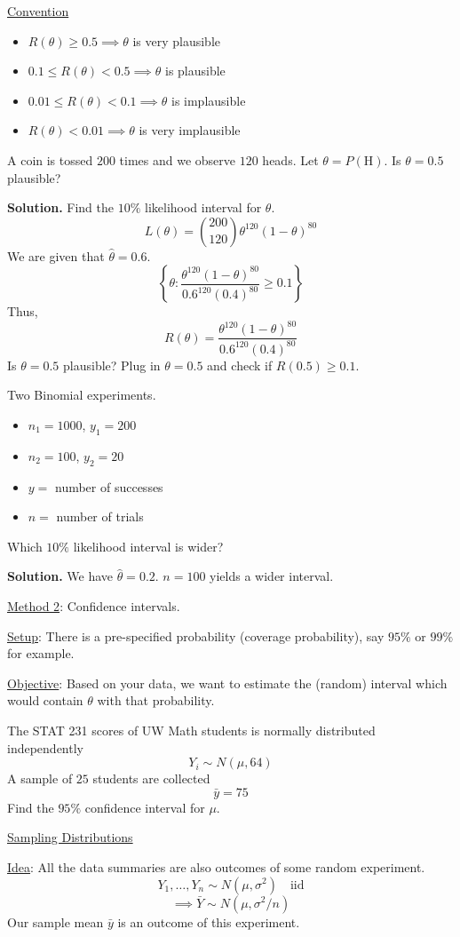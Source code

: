 \underline{Convention}
\begin{itemize}
    \item $ R(\theta)\geqslant 0.5\implies \theta $ is very plausible
    \item $ 0.1\leqslant R(\theta)<0.5\implies \theta $ is plausible
    \item $ 0.01\leqslant R(\theta)<0.1\implies \theta $ is implausible
    \item $ R(\theta)<0.01\implies \theta $ is very implausible
\end{itemize}

\begin{Example}{}{}
    A coin is tossed $ 200 $ times and we observe $ 120 $ heads.
    Let $ \theta=P(\text{H}) $. Is $ \theta=0.5 $ plausible?

    \textbf{Solution.} Find the $ 10\% $ likelihood interval for $ \theta $.
    \[ L(\theta)=\binom{200}{120}\theta^{120}(1-\theta)^{80} \]
    We are given that $ \hat{\theta}=0.6 $.
    \[ \left\{ \theta:\frac{\theta^{120}(1-\theta)^{80}}{0.6^{120}(0.4)^{80}}\geqslant 0.1 \right\} \]
    Thus,
    \[ R(\theta)=\frac{\theta^{120}(1-\theta)^{80}}{0.6^{120}(0.4)^{80}} \]
    Is $ \theta=0.5 $ plausible? Plug in $ \theta=0.5 $ and check if $ R(0.5)\geqslant 0.1 $.
\end{Example}


\begin{Example}{}{}
    Two Binomial experiments.
    \begin{itemize}
        \item $ n_1=1000 $, $ y_1=200 $
        \item $ n_2=100 $, $ y_2=20 $
        \item $ y= $ number of successes
        \item $ n= $ number of trials
    \end{itemize}
    Which $ 10\% $ likelihood interval is wider?

    \textbf{Solution.} We have $ \hat{\theta}=0.2 $.
    $ n=100 $ yields a wider interval.
\end{Example}


\underline{Method 2}: Confidence intervals.

\underline{Setup}: There is a pre-specified probability (coverage probability),
say $ 95\% $ or $ 99\% $ for example.

\underline{Objective}: Based on your data, we want to estimate the (random)
interval which would contain $ \theta $ with that probability.

\begin{Example}{}{}
    The STAT 231 scores of UW Math students is normally distributed independently
    \[ Y_i \sim N(\mu,64) \]
    A sample of $ 25 $ students are collected
    \[ \bar{y}=75 \]
    Find the $ 95\% $ confidence interval for $ \mu $.
\end{Example}

\underline{Sampling Distributions}

\underline{Idea}: All the data summaries are also outcomes of some random experiment.
\[ Y_1,\ldots ,Y_n \sim N(\mu,\sigma^2) \quad\text{iid}\]
\[ \implies \bar{Y} \sim N(\mu,\sigma^2/n) \]
Our sample mean $ \bar{y} $ is an outcome of this experiment.
